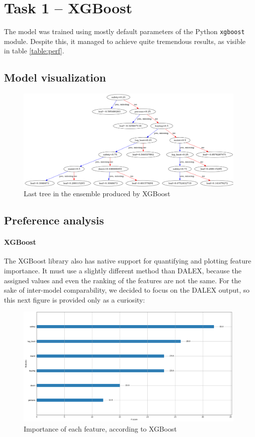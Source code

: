 \documentclass[../main.tex]{subfiles}
\begin{document}
\section{Task 1 -- XGBoost}
The model was trained using mostly default parameters of the Python
\verb`xgboost` module. Despite this, it managed to achieve quite tremendous
results, as visible in table \ref{table:perf}.

\subsection{Model visualization}
\begin{figure}[H]
	\centering
	\includegraphics[width=\linewidth]{../img/xgb-tree.png}
	\caption{Last tree in the ensemble produced by XGBoost}
	\label{fig:xgb-tree}
\end{figure}

\subsection{Preference analysis}

\paragraph{XGBoost} The XGBoost library also has native support for quantifying
and plotting feature importance. It must use a slightly different method than
DALEX, because the assigned values and even the ranking of the features are not
the same. For the sake of inter-model comparability, we decided to focus on the
DALEX output, so this next figure is provided only as a curiosity:
\begin{figure}[H]
	\centering
	\includegraphics[width=\linewidth]{../img/xgb-feature-importance-xgboost.png}
	\caption{Importance of each feature, according to XGBoost}
	\label{fig:xgb-feats-xgboost}
\end{figure}
\end{document}
